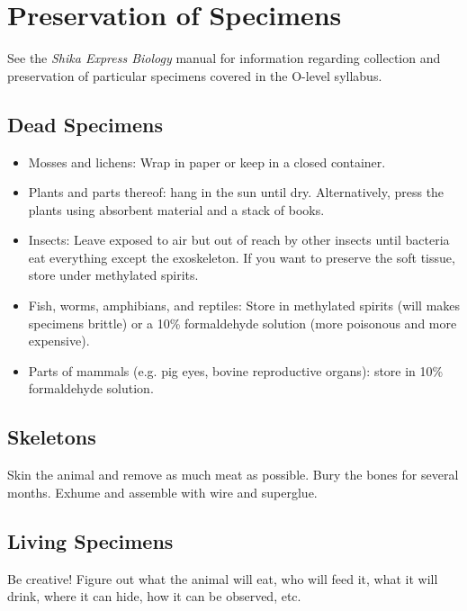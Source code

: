 \chapter{Preservation of Specimens} 

See the \emph{Shika Express Biology} manual for information regarding collection and preservation of particular specimens covered in the O-level syllabus.

\section{Dead Specimens}
\begin{itemize}

\item{Mosses and lichens: 
Wrap in paper or keep in a closed container.}

\item{Plants and parts thereof: 
hang in the sun until dry. 
Alternatively, press the plants using absorbent material and a stack of books.}

\item{Insects: 
Leave exposed to air but out of reach by other insects 
until bacteria eat everything except the exoskeleton. 
If you want to preserve the soft tissue, 
store under methylated spirits.}

\item{Fish, worms, amphibians, and reptiles: 
Store in methylated spirits (will makes specimens brittle) 
or a 10\% formaldehyde solution (more poisonous and more expensive).}

\item{Parts of mammals (e.g. pig eyes, bovine reproductive organs): 
store in 10\% formaldehyde solution.}

\end{itemize}

\section{Skeletons}
Skin the animal and remove as much meat as possible. 
Bury the bones for several months. 
Exhume and assemble with wire and superglue.

\section{Living Specimens}
Be creative! 
Figure out what the animal will eat, 
who will feed it, what it will drink, where it can hide, 
how it can be observed, etc.
